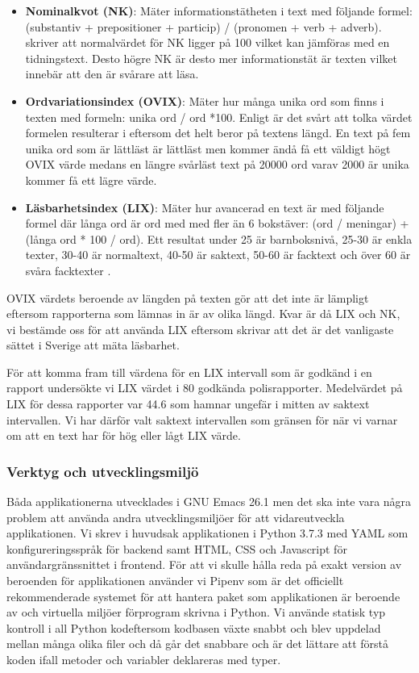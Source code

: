 \documentclass[swedish]{maucsthesis}
\begin{document}
\begin{itemize}
\item \textbf{Nominalkvot (NK)}: Mäter informationstätheten i text med följande
  formel: (substantiv + prepositioner + particip) / (pronomen + verb + adverb).
  \cite{abrahamsson:2011} skriver att normalvärdet för NK ligger på 100 vilket
  kan jämföras med en tidningstext. Desto högre NK är desto mer informationstät
  är texten vilket innebär att den är svårare att läsa.
\item \textbf{Ordvariationsindex (OVIX)}: Mäter hur många unika ord som finns i
  texten med formeln: unika ord / ord *100. Enligt \cite{abrahamsson:2011} är
  det svårt att tolka värdet formelen resulterar i eftersom det helt beror på
  textens längd. En text på fem unika ord som är lättläst är lättläst men kommer
  ändå få ett väldigt högt OVIX värde medans en längre svårläst text på 20000
  ord varav 2000 är unika kommer få ett lägre värde.
\item \textbf{Läsbarhetsindex (LIX)}: Mäter hur avancerad en text är med
  följande formel där långa ord är ord med med fler än 6 bokstäver: (ord /
  meningar) + (långa ord * 100 / ord). Ett resultat under 25 är barnboksnivå,
  25-30 är enkla texter, 30-40 är normaltext, 40-50 är saktext, 50-60 är
  facktext och över 60 är svåra facktexter \citep{abrahamsson:2011}.
\end{itemize}

OVIX värdets beroende av längden på texten gör att det inte är lämpligt eftersom
rapporterna som lämnas in är av olika längd. Kvar är då LIX och NK, vi bestämde
oss för att använda LIX eftersom \cite{abrahamsson:2011} skrivar att det är det
vanligaste sättet i Sverige att mäta läsbarhet.

För att komma fram till värdena för en LIX intervall som är godkänd i en rapport
undersökte vi LIX värdet i 80 godkända polisrapporter. Medelvärdet på LIX för
dessa rapporter var 44.6 som hamnar ungefär i mitten av saktext intervallen. Vi
har därför valt saktext intervallen som gränsen för när vi varnar om att en text
har för hög eller lågt LIX värde.

\subsubsection{Verktyg och utvecklingsmiljö}

Båda applikationerna utvecklades i GNU Emacs 26.1 men det ska inte vara några
problem att använda andra utvecklingsmiljöer för att vidareutveckla
applikationen. Vi skrev i huvudsak applikationen i Python 3.7.3 med YAML som
konfigureringsspråk för backend samt HTML, CSS och Javascript för
användargränssnittet i frontend. För att vi skulle hålla reda på exakt version
av beroenden för applikationen använder vi Pipenv som är det officiellt
rekommenderade systemet för att hantera paket som applikationen är beroende av 
och virtuella miljöer förprogram skrivna i Python. Vi använde statisk typ 
kontroll i all Python kodeftersom kodbasen växte snabbt och blev uppdelad mellan 
många olika filer och då går det snabbare och är det lättare att förstå koden 
ifall metoder och variabler deklareras med typer.
\end{document}
